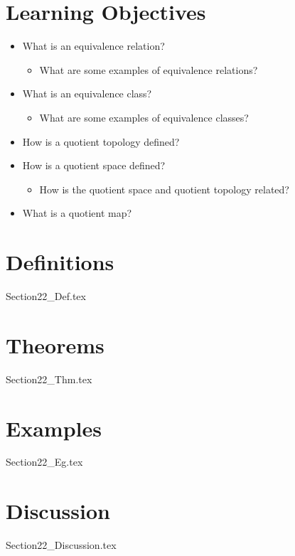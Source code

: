 \section{Learning Objectives}

\begin{itemize}
    \item What is an equivalence relation?
        \begin{itemize}
            \item What are some examples of equivalence relations?
        \end{itemize}
    \item What is an equivalence class?
        \begin{itemize}
            \item What are some examples of equivalence classes?
        \end{itemize}
    \item How is a quotient topology defined?
    \item How is a quotient space defined?
        \begin{itemize}
            \item How is the quotient space and quotient topology related?
        \end{itemize}
    \item What is a quotient map?
\end{itemize}

\section{Definitions}

{Section22_Def.tex}

\section{Theorems}

{Section22_Thm.tex}

\section{Examples}

{Section22_Eg.tex}

\section{Discussion}

{Section22_Discussion.tex}